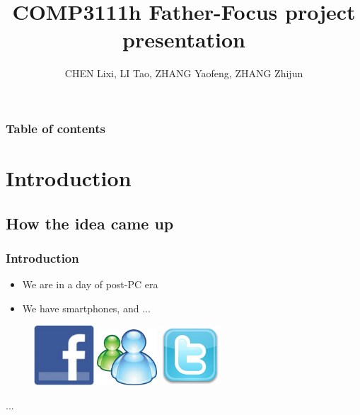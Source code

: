 \documentclass{beamer}
\begin{document}
\title{COMP3111h Father-Focus project presentation}
\author{CHEN Lixi, LI Tao, ZHANG Yaofeng, ZHANG Zhijun}

\begin{frame}
\titlepage
\end{frame}
\begin{frame}\frametitle{Table of contents}\tableofcontents
\end{frame}


\section{Introduction}
\subsection{How the idea came up}
\begin{frame}\frametitle{Introduction}
\begin{itemize}
\item We are in a day of post-PC era
\item We have smartphones, and ...
\end{itemize}

\pause
\begin{figure}
 \includegraphics[width=0.2\textwidth]{fb_log}
 \hspace{1cm}
 \includegraphics[width=0.2\textwidth]{MSN_logo}
 \hspace{1cm}
 \includegraphics[width=0.2\textwidth]{tw_logo}
\end{figure}
...
\end{frame}
\end{document}
